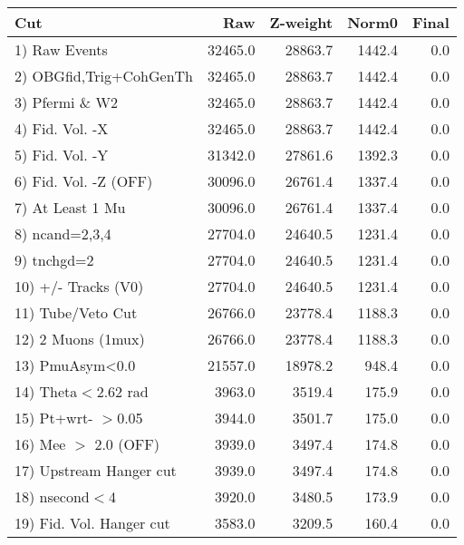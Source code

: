  \begin{table}[h!]\centering
 \begin{tabular}{||l||r|r|r|r||}
 \hline
 \hline
 Cut & Raw & Z-weight & Norm0 & Final \\
 \hline
  1) Raw Events           &     32465.0 &     28863.7 &      1442.4 &         0.0 \\
  2) OBGfid,Trig+CohGenTh &     32465.0 &     28863.7 &      1442.4 &         0.0 \\
  3) Pfermi \& W2         &     32465.0 &     28863.7 &      1442.4 &         0.0 \\
  4) Fid. Vol. -X         &     32465.0 &     28863.7 &      1442.4 &         0.0 \\
  5) Fid. Vol. -Y         &     31342.0 &     27861.6 &      1392.3 &         0.0 \\
  6) Fid. Vol. -Z (OFF)   &     30096.0 &     26761.4 &      1337.4 &         0.0 \\
  7) At Least 1 Mu        &     30096.0 &     26761.4 &      1337.4 &         0.0 \\
  8) ncand=2,3,4          &     27704.0 &     24640.5 &      1231.4 &         0.0 \\
  9) tnchgd=2             &     27704.0 &     24640.5 &      1231.4 &         0.0 \\
 10) +/- Tracks (V0)      &     27704.0 &     24640.5 &      1231.4 &         0.0 \\
 11) Tube/Veto Cut        &     26766.0 &     23778.4 &      1188.3 &         0.0 \\
 12) 2 Muons (1mux)       &     26766.0 &     23778.4 &      1188.3 &         0.0 \\
 13) PmuAsym<0.0          &     21557.0 &     18978.2 &       948.4 &         0.0 \\
 14) Theta$<$2.62 rad     &      3963.0 &      3519.4 &       175.9 &         0.0 \\
 15) Pt+wrt- $>$0.05      &      3944.0 &      3501.7 &       175.0 &         0.0 \\
 16) Mee $>$ 2.0  (OFF)   &      3939.0 &      3497.4 &       174.8 &         0.0 \\
 17) Upstream Hanger cut  &      3939.0 &      3497.4 &       174.8 &         0.0 \\
 18) nsecond$<$4          &      3920.0 &      3480.5 &       173.9 &         0.0 \\
 19) Fid. Vol. Hanger cut &      3583.0 &      3209.5 &       160.4 &         0.0 \\

\end{tabular}
\end{table}
